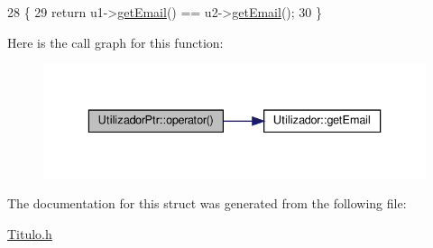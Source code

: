 \begin{DoxyCode}
28                                                                          \{
29         \textcolor{keywordflow}{return} u1->\hyperlink{classUtilizador_aea88bb297704762d0cccc909b8c2da54}{getEmail}() == u2->\hyperlink{classUtilizador_aea88bb297704762d0cccc909b8c2da54}{getEmail}();
30     \}
\end{DoxyCode}
Here is the call graph for this function\+:
\nopagebreak
\begin{figure}[H]
\begin{center}
\leavevmode
\includegraphics[width=336pt]{structUtilizadorPtr_afdc486a21619e0451d59dd4a9f244866_cgraph}
\end{center}
\end{figure}


The documentation for this struct was generated from the following file\+:\begin{DoxyCompactItemize}
\item 
\hyperlink{Titulo_8h}{Titulo.\+h}\end{DoxyCompactItemize}
